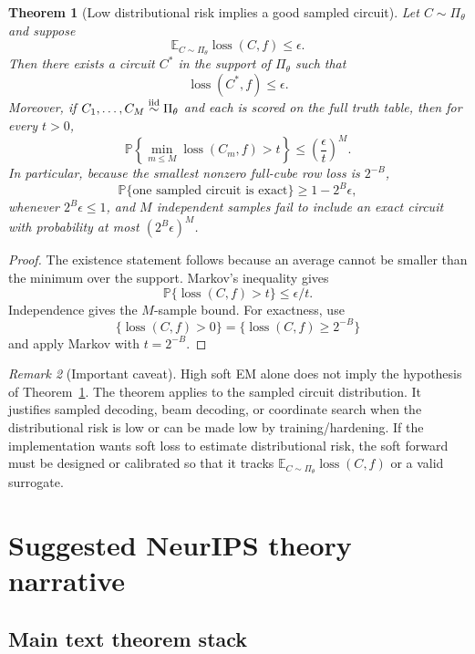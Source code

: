 \documentclass[11pt]{article}
\newtheorem{theorem}{Theorem}[section]
\theoremstyle{definition}
\theoremstyle{remark}
\newtheorem{remark}[theorem]{Remark}
\newcommand{\E}{\mathbb E}
\newcommand{\Pbb}{\mathbb P}
\newcommand{\loss}{\operatorname{loss}}
\begin{document}
\begin{theorem}[Low distributional risk implies a good sampled circuit]
\label{thm:sampling-decoder}
Let $C\sim\Pi_\theta$ and suppose
\[
    \E_{C\sim\Pi_\theta}\loss(C,f)\le\epsilon.
\]
Then there exists a circuit $C^*$ in the support of $\Pi_\theta$ such that
\[
    \loss(C^*,f)\le\epsilon.
\]
Moreover, if $C_1,\ldots,C_M\overset{\rm iid}{\sim}\Pi_\theta$ and each is scored on the full truth table, then for every $t>0$,
\[
    \Pbb\left\{\min_{m\le M}\loss(C_m,f)>t\right\}
    \le
    \left(\frac{\epsilon}{t}\right)^M.
\]
In particular, because the smallest nonzero full-cube row loss is $2^{-B}$,
\[
    \Pbb\{\text{one sampled circuit is exact}\}
    \ge
    1-2^B\epsilon,
\]
whenever $2^B\epsilon\le1$, and $M$ independent samples fail to include an exact circuit with probability at most $(2^B\epsilon)^M$.
\end{theorem}

\begin{proof}
The existence statement follows because an average cannot be smaller than the minimum over the support.  Markov's inequality gives
\[
    \Pbb\{\loss(C,f)>t\}\le \epsilon/t.
\]
Independence gives the $M$-sample bound.  For exactness, use
\[
    \{\loss(C,f)>0\}=\{\loss(C,f)\ge2^{-B}\}
\]
and apply Markov with $t=2^{-B}$.
\end{proof}

\begin{remark}[Important caveat]
High soft EM alone does not imply the hypothesis of Theorem~\ref{thm:sampling-decoder}.  The theorem applies to the sampled circuit distribution.  It justifies sampled decoding, beam decoding, or coordinate search when the distributional risk is low or can be made low by training/hardening.  If the implementation wants soft loss to estimate distributional risk, the soft forward must be designed or calibrated so that it tracks $\E_{C\sim\Pi_\theta}\loss(C,f)$ or a valid surrogate.
\end{remark}

\section{Suggested NeurIPS theory narrative}

\subsection{Main text theorem stack}
\end{document}
